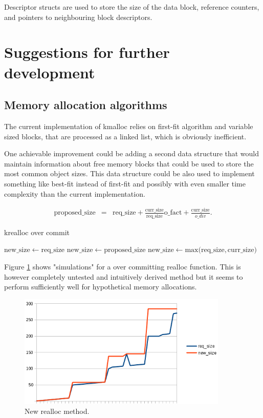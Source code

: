 Descriptor structs are used to store the size of the data block, reference counters,
and pointers to neighbouring block descriptors.


\section{Suggestions for further development}

\subsection{Memory allocation algorithms}

The current implementation of kmalloc relies on first-fit algorithm and variable
sized blocks, that are processed as a linked list, which is obviously inefficient.

One achievable improvement could be adding a second data structure that would
maintain information about free memory blocks that could be used to store the
most common object sizes. This data structure could be also used to implement
something like best-fit instead of first-fit and possibly with even smaller
time complexity than the current implementation.

\begin{eqnarray}
\mathrm{proposed\_size} &=& \mathrm{req\_size}
  + \frac{\mathrm{curr\_size}}{\mathrm{req\_size}} \mathrm{o\_fact}
  + \frac{\mathrm{curr\_size}}{o\_div}.
\end{eqnarray}

\begin{algorithm}
  \caption{krealloc over commit}
  \label{algo:realloc_oc}
  \begin{algorithmic}
        \State $\mathrm{new\_size} \gets \mathrm{req\_size}$
      \Else
          \State $\mathrm{new\_size} \gets \mathrm{proposed\_size}$
        \Else
          \State $\mathrm{new\_size} \gets \mathrm{max(req\_size, curr\_size})$
        \EndIf
      \EndIf
  \end{algorithmic}
\end{algorithm}

Figure \ref{figure:realloc} shows "simulations" for a over committing realloc
function. This is however completely untested and intuitively derived method
but it seems to perform sufficiently well for hypothetical memory allocations.

\begin{figure}
  \center
  \includegraphics[width=10cm]{pics/realloc}
  \caption{New realloc method.}
  \label{figure:realloc}
\end{figure}
